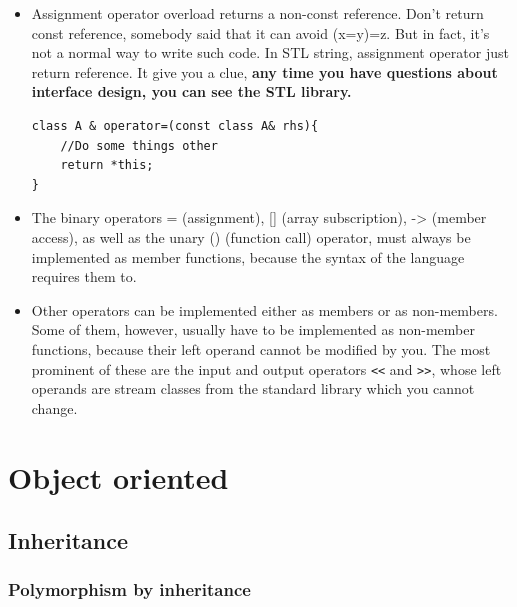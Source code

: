 \documentclass[a4paper,11pt,twoside]{book}
\begin{document}
\begin{itemize}
	\item Assignment operator overload returns a non-const reference. Don't return const reference, somebody said that it can avoid (x=y)=z. But in fact, it's not a normal way to write such code. In STL string, assignment operator just return reference. It give you a clue, \textbf{any time you have questions about interface design, you can see the STL library.}
\begin{lstlisting}[numbers=none]
class A & operator=(const class A& rhs){	
	//Do some things other
	return *this;
}
\end{lstlisting}




\item The binary operators = (assignment), [] (array subscription), -> (member access), as well as the unary () (function call) operator, must always be implemented as member functions, because the syntax of the language requires them to.

\item Other operators can be implemented either as members or as non-members. Some of them, however, usually have to be implemented as non-member functions, because their left operand cannot be modified by you. The most prominent of these are the input and output operators \texttt{<<} and \texttt{>>}, whose left operands are stream classes from the standard library which you cannot change.

	
\end{itemize}


\section{Object oriented}

\subsection{Inheritance}
\subsubsection{Polymorphism by inheritance}
\end{document}
